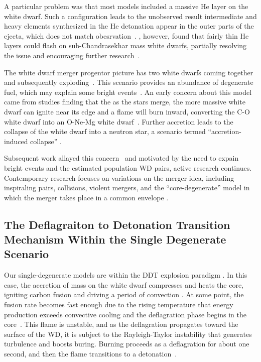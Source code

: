 \documentclass[iop,apj]{emulateapj}
\begin{document}
A particular problem was that most models included a massive He layer on 
the white dwarf. Such a configuration leads to the unobserved result 
intermediate and heavy elements synthesized in the He detonation appear in 
the outer parts of the ejecta, which does not match obesrvation~\citep{HoefKhok96,
hoeflichetal96,finkhillebrandtroepke2007,simetal2010}.  \citet{bildstenetal2007}, 
however, found that fairly thin He layers could flash on sub-Chandrasekhar
mass white dwarfs, partially resolving the issue and encouraging
further research~\citep{simetal2012,brooksetal2015, shenetal2018,
glasneretal2018}.

The white dwarf merger progentor picture has two white dwarfs coming 
together and subsequently exploding~\citep{tutukovyungelson76,tutukovyungelson79,
webbink84,ibentutukov84}. This scenario provides an abundance of degenerate fuel, 
which may explain some bright events~\citep{scalzo:2010,Yuan:2010}. 
An early concern about this model came from studies finding that 
the as the stars merge, the more massive white dwarf can ignite near
its edge and a flame will burn inward, converting the C-O white dwarf into 
an O-Ne-Mg white dwarf~\citep{saionomoto1985,saionomoto2004}.  Further accretion 
leads to the collapse of the white dwarf
into a neutron star, a scenario termed ``accretion-induced collapse''
\citep{nomotokondo1991}.

Subsequent work allayed this concern~\citep{yoonetal2007,lorenaguilaretal2009,
Shenetal12, pakmoretal2012b} and motivated by the need to expain bright events
and the estimated population WD pairs, active research continues. Contemporary
research focuses on variations on the merger idea, including inspiraling pairs, 
collisions, violent mergers, and the ``core-degenerate'' model in which the merger 
takes place in a common envelope \citep{raskinetal2009,pakmoretal2011,kashi:2011,
pakmoretal2012a,Shenetal12,katzetal2016}.


\subsection{The Deflagraiton to Detonation Transition Mechanism Within 
the Single Degenerate Scenario}

Our single-degenerate models are within the DDT explosion paradigm \cite{1986SvAL,
Khokhlov1991Delayed-detonat,NiemWoos97,Niem99,belletal2004,fishjump2015}. 
In this case, the accretion of mass on the white dwarf compresses and 
heats the core, igniting carbon fusion and driving a period of convection
\citep{WoosWunsKuhl04,wunschwoosley2004,Kuhletal06,nonakaetal2012}.
At some point, the fusion rate becomes fast enough due to the rising
temperature that energy production exceeds convective cooling and
the deflagration phase begins in the core~\citep{Nomo84,WoosWunsKuhl04}.
This flame is unstable, and as the deflagration propagates toward the surface
of the WD, it is subject to the Rayleigh-Taylor instability that generates
turbulence and boosts buring.  
Burning proceeds as a deflagration for about one second, and then 
the flame transitions to a detonation~\citep{hoflich.khokhlov.ea:delayed}. 
\end{document}
